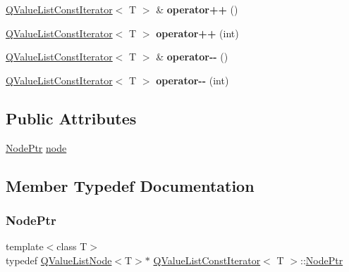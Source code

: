 \begin{DoxyCompactItemize}
\mbox{\hyperlink{class_q_value_list_const_iterator}{Q\+Value\+List\+Const\+Iterator}}$<$ T $>$ \& {\bfseries operator++} ()
\item 
\mbox{\label{class_q_value_list_const_iterator_a1694114389ea175cc6ffb4b04789e43c}} 
\mbox{\hyperlink{class_q_value_list_const_iterator}{Q\+Value\+List\+Const\+Iterator}}$<$ T $>$ {\bfseries operator++} (int)
\item 
\mbox{\label{class_q_value_list_const_iterator_a3fefc8d7db8d64363aa2a780fbb5fa38}} 
\mbox{\hyperlink{class_q_value_list_const_iterator}{Q\+Value\+List\+Const\+Iterator}}$<$ T $>$ \& {\bfseries operator-\/-\/} ()
\item 
\mbox{\label{class_q_value_list_const_iterator_a1004c5add9309565fee043053bca92b9}} 
\mbox{\hyperlink{class_q_value_list_const_iterator}{Q\+Value\+List\+Const\+Iterator}}$<$ T $>$ {\bfseries operator-\/-\/} (int)
\end{DoxyCompactItemize}
\subsection*{Public Attributes}
\begin{DoxyCompactItemize}
\item 
\mbox{\hyperlink{class_q_value_list_const_iterator_a2416aa81d7180a7e83fd7ddc334ec5d1}{Node\+Ptr}} \mbox{\hyperlink{class_q_value_list_const_iterator_a1dab8df146adb2bbd660fb44818aa225}{node}}
\end{DoxyCompactItemize}


\subsection{Member Typedef Documentation}
\mbox{\label{class_q_value_list_const_iterator_a2416aa81d7180a7e83fd7ddc334ec5d1}} 
\subsubsection{\texorpdfstring{NodePtr}{NodePtr}}
{\footnotesize\ttfamily template$<$class T$>$ \\
typedef \mbox{\hyperlink{class_q_value_list_node}{Q\+Value\+List\+Node}}$<$T$>$$\ast$ \mbox{\hyperlink{class_q_value_list_const_iterator}{Q\+Value\+List\+Const\+Iterator}}$<$ T $>$\+::\mbox{\hyperlink{class_q_value_list_const_iterator_a2416aa81d7180a7e83fd7ddc334ec5d1}{Node\+Ptr}}}

